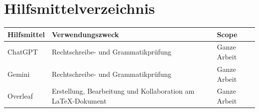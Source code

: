 \documentclass{fhnwreport}         %
\begin{document}
\clearpage
			
\thispagestyle{empty}


\tableofcontents
\clearpage

\listoffigures
\listoftables
\cleardoublepage











{\sloppypar
\printbibliography[heading=bibintoc, title=Quellenverzeichnis]
\section*{Hilfsmittelverzeichnis}

\begin{tabular}{|p{3cm}|p{8cm}|p{3cm}|}
    \hline
    \textbf{Hilfsmittel} & \textbf{Verwendungszweck} & \textbf{Scope}\\
    \hline
    ChatGPT & Rechtschreibe- und Grammatikprüfung & Ganze Arbeit \\
    \hline
    Gemini & Rechtschreibe- und Grammatikprüfung & Ganze Arbeit \\
    \hline
    Overleaf & Erstellung, Bearbeitung und Kollaboration am LaTeX-Dokument & Ganze Arbeit \\
    \hline
\end{tabular}

}




\end{document}
